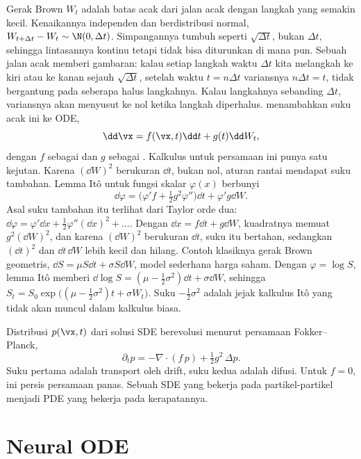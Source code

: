 Gerak Brown $W_t$ adalah batas acak dari jalan acak dengan langkah yang semakin kecil. Kenaikannya
independen dan berdistribusi normal, $W_{t+\Delta t}-W_t\sim\N(0,\Delta t)$. Simpangannya tumbuh
seperti $\sqrt{\Delta t}$, bukan $\Delta t$, sehingga lintasannya kontinu tetapi tidak bisa
diturunkan di mana pun. Sebuah jalan acak memberi gambaran: kalau setiap langkah waktu $\Delta t$ kita
melangkah ke kiri atau ke kanan sejauh $\sqrt{\Delta t}$, setelah waktu $t=n\Delta t$ variansnya
$n\Delta t=t$, tidak bergantung pada seberapa halus langkahnya. Kalau langkahnya sebanding $\Delta t$,
variansnya akan menyusut ke nol ketika langkah diperhalus. 
menambahkan suku acak ini ke ODE,
\begin{equation}
\dd\vx=f(\vx,t)\dd t+g(t)\dd W_t,
\end{equation}
dengan $f$ sebagai  dan $g$ sebagai . Kalkulus untuk persamaan ini
punya satu kejutan. Karena $(\dd W)^2$ berukuran $\dd t$, bukan nol, aturan rantai mendapat suku
tambahan. Lemma Itô untuk fungsi skalar $\varphi(x)$ berbunyi
\begin{equation}
\dd\varphi=\Big(\varphi'f+\tfrac12g^2\varphi''\Big)\dd t+\varphi'g\dd W.
\end{equation}
Asal suku tambahan itu terlihat dari Taylor orde dua:
$\dd\varphi=\varphi'\dd x+\tfrac12\varphi''(\dd x)^2+\dots$. Dengan $\dd x=f\dd t+g\dd W$, kuadratnya memuat
$g^2(\dd W)^2$, dan karena $(\dd W)^2$ berukuran $\dd t$, suku itu bertahan, sedangkan $(\dd t)^2$ dan
$\dd t\,\dd W$ lebih kecil dan hilang. Contoh klasiknya gerak Brown geometris, $\dd S=\mu S\dd t+\sigma S\dd W$, model sederhana harga
saham. Dengan $\varphi=\log S$, lemma Itô memberi $\dd\log S=(\mu-\tfrac12\sigma^2)\dd t+\sigma\dd W$,
sehingga $S_t=S_0\exp\big((\mu-\tfrac12\sigma^2)t+\sigma W_t\big)$. Suku $-\tfrac12\sigma^2$ adalah jejak
kalkulus Itô yang tidak akan muncul dalam kalkulus biasa.

Distribusi $p(\vx,t)$ dari solusi SDE berevolusi menurut persamaan Fokker--Planck,
\begin{equation}
\partial_tp=-\nabla\cdot(f\,p)+\tfrac12g^2\,\Delta p.
\end{equation}
Suku pertama adalah transport oleh drift, suku kedua adalah difusi. Untuk $f=0$, ini persis
persamaan panas. Sebuah SDE yang bekerja pada partikel-partikel menjadi PDE yang bekerja pada
kerapatannya.

\section{Neural ODE}

